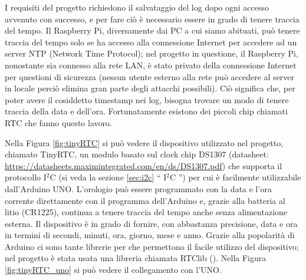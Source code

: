 \documentclass[12pt]{report}
\begin{document}
I requisiti del progetto richiedono il salvataggio del log dopo ogni accesso avvenuto con successo, e per fare ciò è necessario essere in grado di tenere traccia del tempo. Il Raspberry Pi, diversamente dai PC a cui siamo abituati, può tenere traccia del tempo solo se ha accesso alla connessione Internet per accedere ad un server NTP (Network Time Protocol); nel progetto in questione, il Raspberry Pi, nonostante sia connesso alla rete LAN, è stato privato della connessione Internet per questioni di sicurezza (nessun utente esterno alla rete può accedere al server in locale perciò elimina gran parte degli attacchi possibili). Ciò significa che, per poter avere il cosiddetto timestamp nei log, bisogna trovare un modo di tenere traccia della data e dell'ora. Fortunatamente esistono dei piccoli chip chiamati RTC che fanno questo lavoro. 

Nella Figura \ref{fig:tinyRTC} si può vedere il dispositivo utilizzato nel progetto, chiamato TinyRTC, un modulo basato sul clock chip DS1307 (datasheet: \url{https://datasheets.maximintegrated.com/en/ds/DS1307.pdf}) che supporta il protocollo I$^2$C (si veda la sezione \ref{sec:i2c} \textquotedblleft{} I$^2$C \textquotedblright{}) per cui è facilmente utilizzabile dall'Arduino UNO.
L'orologio può essere programmato con la data e l'ora corrente direttamente con il programma dell'Arduino e, grazie alla batteria al litio (CR1225), continua a tenere traccia del tempo anche senza alimentazione esterna. Il dispositivo è in grado di fornire, con abbastanza precisione, data e ora in termini di secondi, minuti, ora, giorno, mese e anno. Grazie alla popolarità di Arduino ci sono tante librerie per che permettono il facile utilizzo del dispositivo; nel progetto è stata usata una libreria chiamata RTClib (\cite{RTClib}). Nella Figura \ref{fig:tinyRTC_uno} si può vedere il collegamento con l'UNO.
\end{document}
